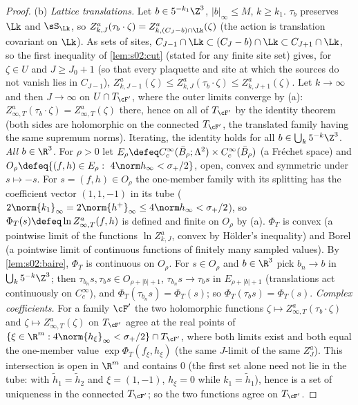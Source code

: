 \begin{proof}
(b) \emph{Lattice translations.} Let $b\in5^{-k_1}\Z^3$, $|b|_\infty\le M$, $k\ge k_1$. $\tau_b$ preserves $\Lk$ and $\sS_{\Lk}$, so $Z^a_{k,J}(\tau_b\cdot\zeta)=Z^a_{k,(C_J-b)\cap\Lk}(\zeta)$ (the action is translation covariant on $\Lk$). As sets of sites, $C_{J-1}\cap\Lk\subset(C_J-b)\cap\Lk\subset C_{J+1}\cap\Lk$, so the first inequality of \cref{lem:s02:cut} (stated for any finite site set) gives, for $\zeta\in U$ and $J\ge J_0+1$ (so that every plaquette and site at which the sources do not vanish lies in $C_{J-1}$), $Z^a_{k,J-1}(\zeta)\le Z^a_{k,J}(\tau_b\cdot\zeta)\le Z^a_{k,J+1}(\zeta)$. Let $k\to\infty$ and then $J\to\infty$ on $U\cap T_{\cF'}$, where the outer limits converge by (a): $Z^a_{\infty,T}(\tau_b\cdot\zeta)=Z^a_{\infty,T}(\zeta)$ there, hence on all of $T_{\cF'}$ by the identity theorem (both sides are holomorphic on the connected $T_{\cF'}$, the translated family having the same supremum norms). Iterating, the identity holds for all $b\in\bigcup_k5^{-k}\Z^3$.
\emph{All $b\in\R^3$.} For $\rho>0$ let $E_\rho\defeq C^\infty_c(\bar B_\rho;\Lambda^2)\times C^\infty_c(\bar B_\rho)$ (a Fr\'echet space) and $O_\rho\defeq\{(f,h)\in E_\rho:\ 4\norm h_\infty<\sigma_+/2\}$, open, convex and symmetric under $s\mapsto-s$. For $s=(f,h)\in O_\rho$ the one-member family with its splitting has the coefficient vector $(1,1,-1)$ in its tube ($2\norm{k_1}_\infty=2\norm{h^+}_\infty\le4\norm h_\infty<\sigma_+/2$), so $\Phi_T(s)\defeq\ln Z^a_{\infty,T}(f,h)$ is defined and finite on $O_\rho$ by (a). $\Phi_T$ is convex (a pointwise limit of the functions $\ln Z^a_{k,J}$, convex by H\"older's inequality) and Borel (a pointwise limit of continuous functions of finitely many sampled values). By \cref{lem:s02:baire}, $\Phi_T$ is continuous on $O_\rho$. For $s\in O_\rho$ and $b\in\R^3$ pick $b_n\to b$ in $\bigcup_k5^{-k}\Z^3$; then $\tau_{b_n}s,\tau_bs\in O_{\rho+|b|+1}$, $\tau_{b_n}s\to\tau_bs$ in $E_{\rho+|b|+1}$ (translations act continuously on $C^\infty_c$), and $\Phi_T(\tau_{b_n}s)=\Phi_T(s)$; so $\Phi_T(\tau_bs)=\Phi_T(s)$.
\emph{Complex coefficients.} For a family $\cF'$ the two holomorphic functions $\zeta\mapsto Z^a_{\infty,T}(\tau_b\cdot\zeta)$ and $\zeta\mapsto Z^a_{\infty,T}(\zeta)$ on $T_{\cF'}$ agree at the real points of $\{\xi\in\R^m:4\norm{h_\xi}_\infty<\sigma_+/2\}\cap T_{\cF'}$, where both limits exist and both equal the one-member value $\exp\Phi_T(f_\xi,h_\xi)$ (the same $J$-limit of the same $Z^a_J$). This intersection is open in $\R^m$ and contains $0$ (the first set alone need not lie in the tube: with $\tilde h_1=\tilde h_2$ and $\xi=(1,-1)$, $h_\xi=0$ while $k_1=\tilde h_1$), hence is a set of uniqueness in the connected $T_{\cF'}$; so the two functions agree on $T_{\cF'}$.
\end{proof}

